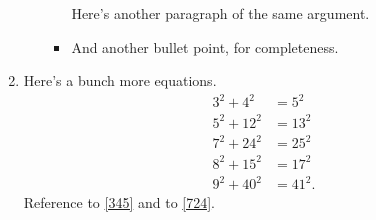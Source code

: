 \documentclass[onesided]{../ccg-pset}
\begin{document}
\begin{enumerate}
\begin{enumerate}
\begin{itemize}
		Here's another paragraph of the same argument.
		\item And another bullet point, for completeness.
	\end{itemize}
\end{enumerate}
\item Here's a bunch more equations.
\begin{align}
	\label{345}
	3^2 + 4^2 &= 5^2\\
	5^2 + 12^2 &= 13^2\\
	\label{724}
	7^2 + 24^2 &= 25^2\\
	8^2 + 15^2 &= 17^2\\
	9^2 + 40^2 &= 41^2.
\end{align}
Reference to \eqref{345} and to \eqref{724}.
\end{enumerate}
\end{document}
